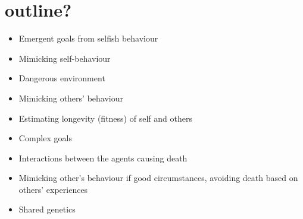 \documentclass[a4paper]{article}
\begin{document}
\section*{outline?}

\begin{itemize}
\item   Emergent goals from selfish behaviour
\item   Mimicking self-behaviour
\item   Dangerous environment
\item   Mimicking others' behaviour
\item   Estimating longevity (fitness) of self and others
\item   Complex goals
\item   Interactions between the agents causing death
\item   Mimicking other's behaviour if good circumstances, avoiding death
    based on others' experiences
\item   Shared genetics
\end{itemize}
\end{document}
